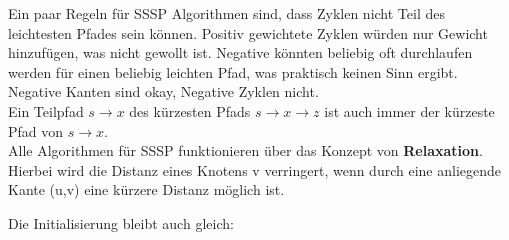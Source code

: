 \documentclass[
../AuD-Zusammenfassung.tex,
]
{subfiles}
\begin{document}
Ein paar Regeln für SSSP Algorithmen sind, dass Zyklen nicht Teil des leichtesten Pfades sein können. Positiv gewichtete Zyklen würden nur Gewicht hinzufügen, was nicht gewollt ist. Negative könnten beliebig oft durchlaufen werden für einen beliebig leichten Pfad, was praktisch keinen Sinn ergibt. Negative Kanten sind okay, Negative Zyklen nicht.\\
Ein Teilpfad $ s \rightarrow x $ des kürzesten Pfads $ s \rightarrow x \rightarrow z $ ist auch immer der kürzeste Pfad von $ s \rightarrow x $.\\
Alle Algorithmen für SSSP funktionieren über das Konzept von \textbf{Relaxation}. Hierbei wird die Distanz eines Knotens v verringert, wenn durch eine anliegende Kante (u,v) eine kürzere Distanz möglich ist. \\
\begin{algorithm}[H]
\end{algorithm}
Die Initialisierung bleibt auch gleich:\\
\begin{algorithm}[H]
\end{algorithm}
\newpage
\end{document}
